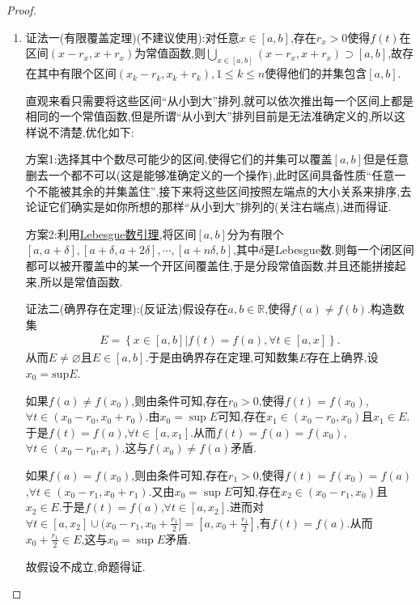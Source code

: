 \documentclass[../../main.tex]{subfiles}%
\begin{document}
\begin{proof}
\begin{enumerate}
\item 
{\color{blue}证法一(有限覆盖定理)(不建议使用):}对任意\(x\in[a,b]\),存在\(r_x>0\)使得\(f(t)\)在区间\((x - r_x,x + r_x)\)为常值函数,则\(\bigcup_{x\in[a,b]} (x - r_x,x + r_x) \supset [a,b]\),故存在其中有限个区间\((x_k - r_k,x_k + r_k),1\leqslant  k\leqslant  n\)使得他们的并集包含\([a,b]\).

直观来看只需要将这些区间“从小到大”排列,就可以依次推出每一个区间上都是相同的一个常值函数,但是所谓“从小到大”排列目前是无法准确定义的,所以这样说不清楚,优化如下:

方案1:选择其中个数尽可能少的区间,使得它们的并集可以覆盖\([a,b]\)但是任意删去一个都不可以(这是能够准确定义的一个操作),此时区间具备性质“任意一个不能被其余的并集盖住”,接下来将这些区间按照左端点的大小关系来排序,去论证它们确实是如你所想的那样“从小到大”排列的(关注右端点),进而得证.

方案2:利用\hyperref[lemma:Lebesgue数引理]{Lebesgue数引理},将区间\([a,b]\)分为有限个\([a,a + \delta],[a + \delta,a + 2\delta],\cdots,[a + n\delta,b]\),其中$\delta$是Lebesgue数.则每一个闭区间都可以被开覆盖中的某一个开区间覆盖住,于是分段常值函数,并且还能拼接起来,所以是常值函数.

{\color{blue}证法二(确界存在定理):}(反证法)假设存在$a,b\in \mathbb{R}$,使得$f(a)\ne f(b)$.构造数集
\begin{align*}
E=\left\{ x\in \left[ a,b \right] |f\left( t \right) =f\left( a \right) ,\forall t\in \left[ a,x \right] \right\}.
\end{align*}
从而$E\ne \varnothing$且$E\in[a,b]$.于是由确界存在定理,可知数集$E$存在上确界,设$x_0=\mathrm{sup}E$.

如果\(f(a)\neq f(x_0)\),则由条件可知,存在\(r_0 > 0\),使得\(f(t)=f(x_0)\),\(\forall t\in(x_0 - r_0,x_0 + r_0)\).由\(x_0 = \sup E\)可知,存在\(x_1\in(x_0 - r_0,x_0)\)且\(x_1\in E\).于是\(f(t)=f(a)\),\(\forall t\in[a,x_1]\).从而\(f(t)=f(a)=f(x_0)\),\(\forall t\in(x_0 - r_0,x_1)\).这与\(f(x_0)\neq f(a)\)矛盾.

如果\(f(a)=f(x_0)\),则由条件可知,存在\(r_1 > 0\),使得\(f(t)=f(x_0)=f(a)\),\(\forall t\in(x_0 - r_1,x_0 + r_1)\).又由\(x_0 = \sup E\)可知,存在\(x_2\in(x_0 - r_1,x_0)\)且\(x_2\in E\).于是\(f(t)=f(a)\),\(\forall t\in[a,x_2]\).进而对\(\forall t\in[a,x_2]\cup(x_0 - r_1,x_0+\frac{r_1}{2}]=[a,x_0+\frac{r_1}{2}]\),有\(f(t)=f(a)\).从而\(x_0+\frac{r_1}{2}\in E\),这与\(x_0 = \sup E\)矛盾.

故假设不成立,命题得证.


\end{enumerate}
\end{proof}
\end{document}
